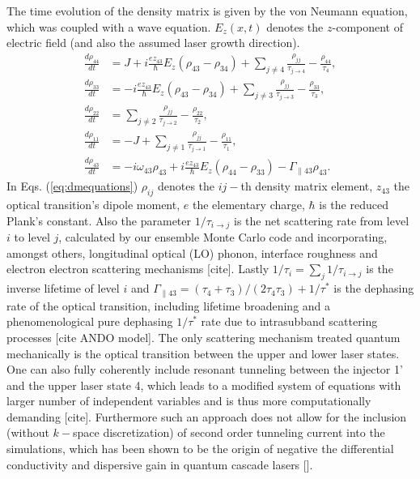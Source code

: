 \documentclass[11pt,final]{scrbook}
\begin{document}
The time evolution of the density matrix is given by the von Neumann equation, which was coupled with a wave equation. $E_z(x,t)$ denotes the $z$-component of electric field (and also the assumed laser growth direction).  
\begin{subequations}
	\label{eq:dmequations}
 \begin{align}
	\frac{d\rho_{44}}{dt} &= J +i\frac{ez_{43}}{\hbar}E_z(\rho_{43}-\rho_{34}) + \sum_{j\neq 4} \frac{\rho_{jj}}{\tau_{j\rightarrow 4}}  - \frac{\rho_{44}}{\tau_{4}}, \\
	\frac{d\rho_{33}}{dt} &= -i\frac{ez_{43}}{\hbar}E_z(\rho_{43}-\rho_{34}) + \sum_{j\neq 3} \frac{\rho_{jj}}{\tau_{j\rightarrow 3}} - \frac{\rho_{33}}{\tau_{3}}, \\
	\frac{d\rho_{22}}{dt} &= \sum_{j\neq 2} \frac{\rho_{jj}}{\tau_{j\rightarrow 2}} - \frac{\rho_{22}}{\tau_{2}}, \\
	\frac{d\rho_{11}}{dt} &=  -J + \sum_{j\neq 1} \frac{\rho_{jj}}{\tau_{j\rightarrow 1}} - \frac{\rho_{11}}{\tau_{1}}, \\
	\frac{d\rho_{43}}{dt} &= - i\omega_{43}\rho_{43} + i\frac{ez_{43}}{\hbar}E_z(\rho_{44}-\rho_{33})-\Gamma_{\parallel 43}\rho_{43}.
 \end{align}
\end{subequations}
In Eqs. (\ref{eq:dmequations}) $\rho_{ij}$ denotes the $ij-$th density matrix element,  $z_{43}$ the optical transition's dipole moment, $e$ the elementary charge, $\hbar$ is the reduced Plank's constant. Also the parameter $1/\tau_{i\rightarrow j}$ is the net scattering rate from level $i$ to level $j$, calculated by our ensemble Monte Carlo code and incorporating, amongst others, longitudinal optical (LO) phonon, interface roughness and electron electron scattering mechanisms [cite]. Lastly $1/\tau_{i} = \sum_j 1/\tau_{i\rightarrow j}$ is the inverse lifetime of level $i$ and $\Gamma_{\parallel 43} = (\tau_4+\tau_3)/(2\tau_4\tau_3)+1/\tau^*$ is the dephasing rate of the optical transition, including lifetime broadening and a phenomenological pure dephasing $1/\tau^*$ rate due to intrasubband scattering processes [cite ANDO model]. The only scattering mechanism treated quantum mechanically is the optical transition between the upper and lower laser states. One can also fully coherently include resonant tunneling between the injector 1' and the upper laser state 4, which leads to a modified system of equations with larger number of independent variables and is thus more computationally demanding [cite]. Furthermore such an approach does not allow for the inclusion (without $k-$space discretization) of second order tunneling current into the simulations, which has been shown to be the origin of negative the differential conductivity and dispersive gain in quantum cascade lasers []. 
\end{document}
